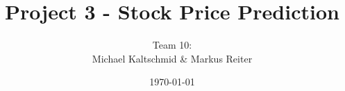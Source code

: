 \documentclass[a4paper]{DPSbachelor}
\title{Project 3 - Stock Price Prediction}
\author{Team 10: \\ Michael Kaltschmid \& Markus Reiter}
\date{\today}
\begin{document}
  \maketitle

	\abstract{}

  \tableofcontents
  \listoffigures
  \listoftables

  
  
  
  
  


\end{document}

